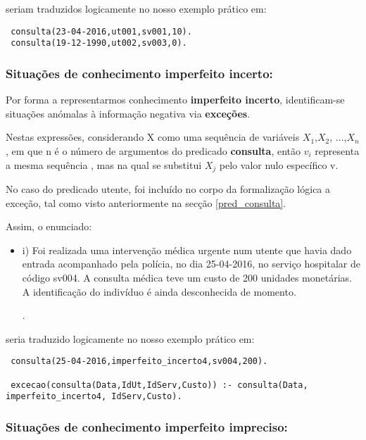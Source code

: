 \documentclass[
  oneside,
  10pt, a4paper,
  footinclude=true,
  headinclude=true,
  cleardoublepage=empty
]{scrbook}
\begin{document}
seriam traduzidos logicamente  no nosso exemplo prático em:
\begin{lstlisting}
 consulta(23-04-2016,ut001,sv001,10).
 consulta(19-12-1990,ut002,sv003,0).
\end{lstlisting}


\subsubsection{\textbf{Situações de conhecimento imperfeito incerto:}}

Por forma a representarmos conhecimento \textbf{imperfeito incerto}, identificam-se situações anómalas à informação negativa via \textbf{exceções}.\par 
Nestas expressões, considerando X como uma sequência de variáveis $X_{1}$,$X_{2}$, ...,$X_{n}$, em que n é o número de argumentos do predicado \textbf{consulta}, então $v_{i}$ representa a mesma sequência , mas na qual se substitui $X_{j}$ pelo valor nulo específico v.\par No caso do predicado utente, foi incluído no corpo da formalização lógica a exceção, tal como visto anteriormente na secção \ref{pred_consulta}.\par 

Assim, o enunciado: 
\begin{itemize}
\item i) Foi realizada uma intervenção médica urgente num utente que havia dado entrada acompanhado pela polícia, no dia 25-04-2016,
no serviço hospitalar de código sv004. A consulta médica teve um custo de 200 unidades monetárias. A identificação do indivíduo é ainda desconhecida de momento.

.
\end{itemize}

seria traduzido logicamente  no nosso exemplo prático em:
\begin{lstlisting}
 consulta(25-04-2016,imperfeito_incerto4,sv004,200).
 
 excecao(consulta(Data,IdUt,IdServ,Custo)) :- consulta(Data, imperfeito_incerto4, IdServ,Custo).
\end{lstlisting}

\subsubsection{\textbf{Situações de conhecimento imperfeito impreciso:}}
\end{document}
